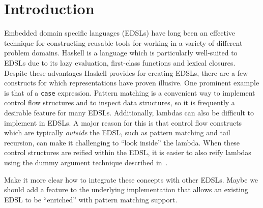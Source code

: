 \documentclass[runningheads, a4paper]{llncs}
\newcommand{\ttt}{\texttt}
\newenvironment{todo}
  {\ifthenelse{\isundefined{\showtodos}}{\comment}{\begin{tcolorbox}
    \textbf{TODO}:}}
  {\ifthenelse{\isundefined{\showtodos}}{\endcomment}{\end{tcolorbox}}
  }
\begin{document}




\section{Introduction}

Embedded domain specific languages (EDSLs) have long been an effective
technique for constructing reusable tools for working in a variety of
different problem domains. Haskell is a language which is particularly
well-suited to EDSLs due to its lazy evaluation, first-class functions and
lexical closures.
%
Despite these advantages Haskell provides for creating EDSLs, there are a few
constructs for which representations have proven illusive. One prominent example
is that of a \ttt{case} expression. Pattern matching is a convenient way to
implement control flow structures and to inspect data structures, so it is
frequently a desirable feature for many EDSLs.
%
Additionally, lambdas can also be difficult to implement in EDSLs. A major reason
for this is that control flow constructs which are typically \textit{outside} the EDSL,
such as pattern matching and tail recursion, can make it challenging to ``look inside''
the lambda. When these control structures are reified within the EDSL, it is
easier to also reify lambdas using the dummy argument technique described in~\cite{Elliott:03:CompileDSEL-JFP}.


\begin{todo}
  Make it more clear how to integrate these concepts with other EDSLs. Maybe we should
  add a feature to the underlying implementation that allows an existing EDSL to be
  ``enriched'' with pattern matching support.
\end{todo}
\end{document}
